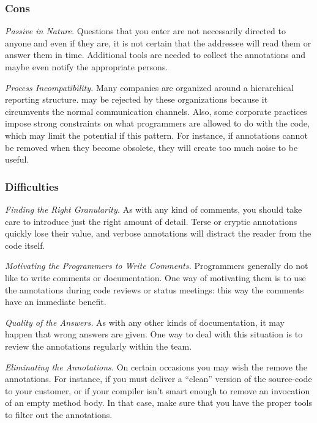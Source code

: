 \documentclass[a4paper,10pt,twoside]{book}
\begin{document}
\subsubsection*{Cons}

\begin{bulletlist}
\item \emph{Passive in Nature.} Questions that you enter are not necessarily directed to anyone and even if they are, it is not certain that the addressee will read them or answer them in time. Additional tools are needed to collect the annotations and maybe even notify the appropriate persons.

\item \emph{Process Incompatibility.} Many companies are organized around a hierarchical reporting structure.  may be rejected by these organizations because it circumvents the normal communication channels. Also, some corporate practices impose strong constraints on what programmers are allowed to do with the code, which may limit the potential if this pattern. For instance, if annotations cannot be removed when they become obsolete, they will create too much noise to be useful.
\end{bulletlist}

\subsubsection*{Difficulties}

\begin{bulletlist}
\item \emph{Finding the Right Granularity.} As with any kind of comments, you should take care to introduce just the right amount of detail. Terse or cryptic annotations quickly lose their value, and verbose annotations will distract the reader from the code itself.

\item \emph{Motivating the Programmers to Write Comments.} Programmers generally do not like to write comments or documentation. One way of motivating them is to use the annotations during code reviews or status meetings: this way the comments have an immediate benefit.

\item \emph{Quality of the Answers.}
As with any other kinds of documentation, it may happen that wrong answers are given. One way to deal with this situation is to review the annotations regularly within the team.

\item \emph{Eliminating the Annotations.}
On certain occasions you may wish the remove the annotations. For instance, if you must deliver a ``clean'' version of the source-code to your customer, or if your compiler isn't smart enough to remove an invocation of an empty method body. In that case, make sure that you have the proper tools to filter out the annotations.
\end{bulletlist}
\end{document}
